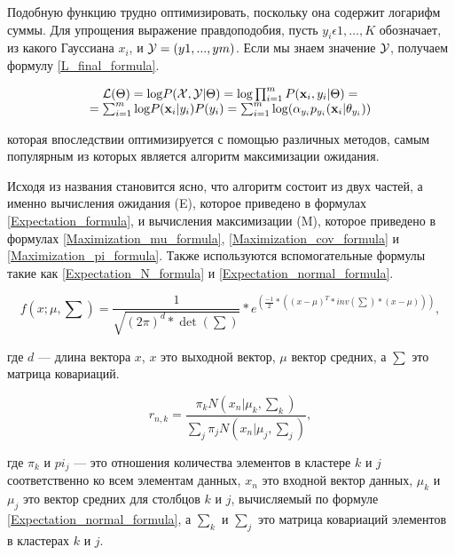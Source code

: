 Подобную функцию трудно оптимизировать, поскольку она содержит логарифм суммы. Для упрощения выражение правдоподобия, пусть $y_i\epsilon{1,…,K}$ обозначает, из какого Гауссиана $x_i$, и ${\cal Y}=(y1,...,ym)$. Если мы знаем значение ${\cal Y}$, получаем формулу \ref{L_final_formula}.

\begin{equation}
\label{L_final_formula}
\begin{matrix}
{\cal L}(\Theta)={\rm log} P({\cal X}, {\cal Y}\vert \Theta)={\rm log} \prod_{i=1}^m P({\bf x}_i, y_i\vert \Theta)=\\
=\sum_{i=1}^m{\rm log} P({\bf x}_i\vert y_i)P(y_i)=\sum_{i=1}^m{\rm log}( \alpha_{y_i} p_{y_i}({\bf x}_i \vert \theta_{y_i}))
\end{matrix}
\end{equation}

которая впоследствии оптимизируется с помощью различных методов, самым популярным из которых является алгоритм максимизации ожидания.

Исходя из названия становится ясно, что алгоритм состоит из двух частей, а именно вычисления ожидания (E), которое приведено в формулах \ref{Expectation_formula}, и вычисления максимизации (M), которое приведено в формулах \ref{Maximization_mu_formula}, \ref{Maximization_cov_formula} и \ref{Maximization_pi_formula}. Также используются вспомогательные формулы такие как \ref{Expectation_N_formula} и \ref{Expectation_normal_formula}.

\begin{equation}
\label{Expectation_normal_formula}
f(x; \mu, \sum) = \frac{1}{\sqrt{(2\pi) ^d * \det(\sum)}} * e^(\frac{-1}{2}*((x - \mu)^T * inv(\sum)*(x - \mu))),
\end{equation}

где $d$ --- длина вектора $x$, $x$ это выходной вектор, $\mu$ вектор средних, а $\sum$ это матрица ковариаций.

\begin{equation}
\label{Expectation_formula}
r_{n,k} = \frac{\pi_kN(x_n|\mu_k, \sum_k)}{\sum_j\pi_jN(x_n|\mu_j, \sum_j)},
\end{equation}

где $\pi_k$ и $pi_j$ --- это отношения количества элементов в кластере $k$ и $j$ соответственно ко всем элементам данных, $x_n$ это входной вектор данных, $\mu_k$ и $\mu_j$ это вектор средних для столбцов $k$ и $j$, вычисляемый по формуле \ref{Expectation_normal_formula}, а $\sum_k$ и $\sum_j$ это матрица ковариаций элементов в кластерах $k$ и $j$.

